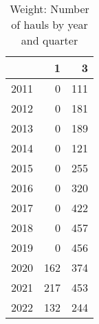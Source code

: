 \begin{table}[ht]
\centering
\begin{tabular}{rrr}
  \hline
 & 1 & 3 \\ 
  \hline
2011 & 0 & 111 \\ 
  2012 & 0 & 181 \\ 
  2013 & 0 & 189 \\ 
  2014 & 0 & 121 \\ 
  2015 & 0 & 255 \\ 
  2016 & 0 & 320 \\ 
  2017 & 0 & 422 \\ 
  2018 & 0 & 457 \\ 
  2019 & 0 & 456 \\ 
  2020 & 162 & 374 \\ 
  2021 & 217 & 453 \\ 
  2022 & 132 & 244 \\ 
   \hline
\end{tabular}
\caption{Weight: Number of hauls by year and quarter} 
\end{table}
